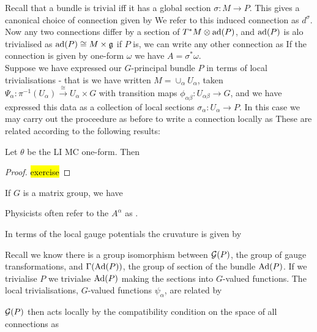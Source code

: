 \documentclass{article}
\begin{document}
Recall that a bundle is trivial iff it has a global section $\sigma : M \to P$. This gives a canonical choice of connection given by 
We refer to this induced connection as $d^\sigma$. \\
Now any two connections differ by a section of $T^\ast M \otimes \operatorname{ad}(P)$, and $\operatorname{ad}(P)$ is alo trivialised as $\operatorname{ad}(P) \cong M \times \mathfrak{g}$ if $P$ is, we can write any other connection as 
If the connection is given by one-form $\omega$ we have $A = \sigma^\ast \omega$. \\
Suppose we have expressed our $G$-principal bundle $P$ in terms of local trivialisations - that is we have written $M = \cup_\alpha U_\alpha$, taken $\Psi_\alpha : \pi^{-1}(U_\alpha) \overset{\cong}{\to} U_\alpha \times G$ with transition maps $\phi_{\alpha\beta}:U_{\alpha\beta} \to G$, and we have expressed this data as a collection of local sections $\sigma_\alpha : U_\alpha \to P$. In this case we may carry out the proceedure as before to write a connection locally as 
These are related according to the following results:
\begin{theorem}
	Let $\theta$ be the LI MC one-form. Then 
\end{theorem}
\begin{proof}
\hl{exercise}
\end{proof}

\begin{corollary}
	If $G$ is a matrix group, we have 
\end{corollary}

\begin{remark}
	Physicists often refer to the $A^\alpha$ as . 
\end{remark}

\begin{prop}
	In terms of the local gauge potentials the cruvature is given by 
\end{prop}


Recall we know there is a group isomorphism between $\mathcal{G}(P)$, the group of gauge transformations, and $\Gamma(\operatorname{Ad}(P))$, the group of section of the bundle $\operatorname{Ad}(P)$. If we trivialise $P$ we trivialse $\operatorname{Ad}(P)$ making the sections into $G$-valued functions. The local trivialisations, $G$-valued functions $\psi_\alpha$, are related by 
\begin{prop}
$\mathcal{G}(P)$ then acts locally by the compatibility condition on the space of all connections as 
\end{prop}
\end{document}
